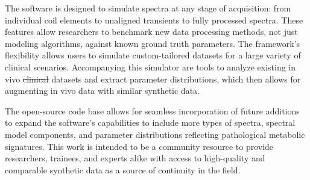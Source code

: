 \documentclass[AMA,LATO1COL]{WileyNJD-v2}
\providecommand{\DIFdel}[1]{{\protect\color{red}\sout{#1}}}                      %
\providecommand{\DIFaddbegin}{} %
\providecommand{\DIFdelbegin}{} %
\providecommand{\DIFdelend}{} %
\begin{document}
\DIFdelend The software is designed to simulate spectra at any stage of acquisition: from individual coil elements to unaligned transients to fully processed spectra. These features allow researchers to benchmark new data processing methods, not just modeling algorithms, against known ground truth parameters. The framework's flexibility allows users to simulate custom-tailored datasets for a large variety of clinical scenarios. Accompanying this simulator are tools to analyze existing in vivo \DIFdelbegin \DIFdel{clinical }\DIFdelend datasets and extract parameter distributions, which then allows for augmenting in vivo data with similar synthetic data. 
\DIFdelbegin %

\DIFdelend The open-source code base allows for seamless incorporation of future additions to expand the software's capabilities to include more types of spectra, spectral model components, and parameter distributions reflecting pathological metabolic signatures. This work is intended to be a community resource to provide researchers, trainees, and experts alike with access to high-quality and comparable synthetic data as a source of continuity in the field.


 \DIFaddbegin 
\end{document}
